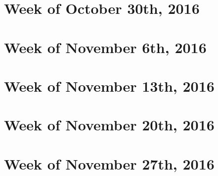 \documentclass{article}
\begin{document}
\section{Week of October 30th, 2016}
\section{Week of November 6th, 2016}
\section{Week of November 13th, 2016}
\section{Week of November 20th, 2016}
\section{Week of November 27th, 2016}
\end{document}
